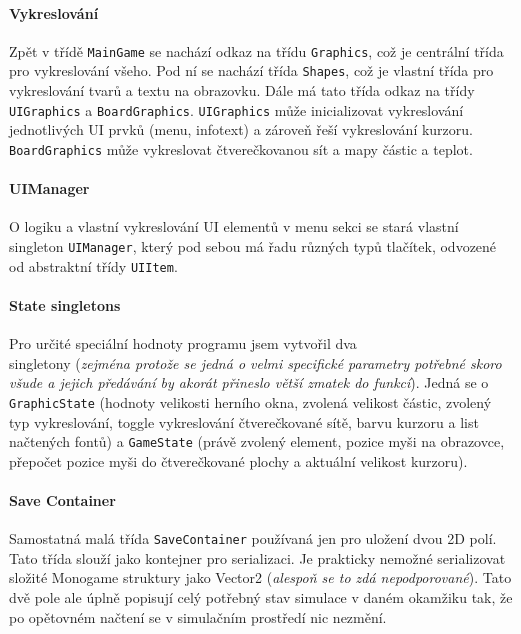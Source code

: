 \documentclass[a4paper, 12pt]{article}
\begin{document}
\paragraph{Vykreslování}
Zpět v třídě \texttt{MainGame} se nachází odkaz na třídu \texttt{Graphics}, což
je centrální třída pro vykreslování všeho. Pod ní se nachází třída
\texttt{Shapes}, což je vlastní třída pro vykreslování tvarů a textu na
obrazovku. Dále má tato třída odkaz na třídy \texttt{UIGraphics} a
\texttt{BoardGraphics}. \texttt{UIGraphics} může inicializovat vykreslování
jednotlivých UI prvků (menu, infotext) a zároveň řeší vykreslování kurzoru.
\texttt{BoardGraphics} může vykreslovat čtverečkovanou sít a mapy částic a
teplot.

\paragraph{UIManager}
O logiku a vlastní vykreslování UI elementů v menu sekci se stará vlastní
singleton \texttt{UIManager}, který pod sebou má řadu různých typů tlačítek,
odvozené od abstraktní třídy \texttt{UIItem}.

\paragraph{State singletons}
Pro určité speciální hodnoty programu jsem vytvořil dva \\singletony (\emph{zejména
protože se jedná o velmi specifické parametry potřebné skoro všude a jejich
předávání by akorát přineslo větší zmatek do funkcí}). Jedná se o
\texttt{GraphicState} (hodnoty velikosti herního okna, zvolená
velikost částic, zvolený typ vykreslování, toggle vykreslování čtverečkované
sítě, barvu kurzoru a list načtených fontů) a \texttt{GameState} (právě zvolený
element, pozice myši na obrazovce, přepočet pozice myši do čtverečkované plochy
a aktuální velikost kurzoru).

\paragraph{Save Container}
Samostatná malá třída \texttt{SaveContainer} používaná jen pro uložení dvou 2D polí. 
Tato třída slouží jako kontejner pro serializaci. Je prakticky nemožné serializovat 
složité Monogame struktury jako Vector2 (\emph{alespoň se to zdá 
nepodporované}). Tato dvě pole ale úplně popisují celý potřebný stav simulace v 
daném okamžiku tak, že po opětovném načtení se v simulačním prostředí nic nezmění.
\end{document}

